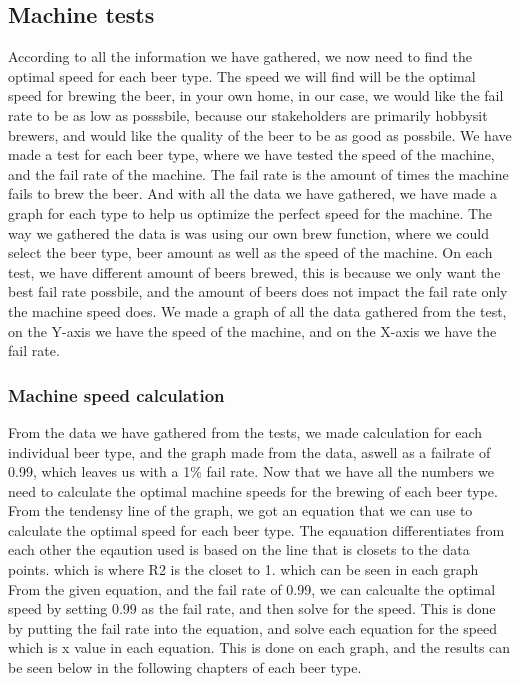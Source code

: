 \subsection{Machine tests}
According to all the information we have gathered, we now need to find the optimal speed for each beer type. The speed we will find will be the optimal speed for brewing the beer, in your own home, in our case,
we would like the fail rate to be as low as posssbile, because our stakeholders are primarily hobbysit brewers, and would like the quality of the beer to be as good as possbile.
We have made a test for each beer type, where we have tested the speed of the machine, and the fail rate of the machine. The fail rate is the amount of times the machine fails to brew the beer.
And with all the data we have gathered, we have made a graph for each type to help us optimize the perfect speed for the machine. \newline
The way we gathered the data is was using our own brew function, where we could select the beer type, beer amount as well as the speed of the machine. On each test, we have different amount of beers brewed, this is because we only want the best fail rate possbile, and the amount of beers does not impact the fail rate only the machine speed does.
We made a graph of all the data gathered from the test, on the Y-axis we have the speed of the machine, and on the X-axis we have the fail rate. \newline

\subsubsection{Machine speed calculation}
From the data we have gathered from the tests, we made calculation for each individual beer type, and the graph made from the data, aswell as a failrate of 0.99, 
which leaves us with a 1\% fail rate. Now that we have all the numbers we need to calculate the optimal machine speeds for the brewing of each beer type. \newline
From the tendensy line of the graph, we got an equation that we can use to calculate the optimal speed for each beer type. The eqauation differentiates from each other the eqaution used is based on the line that is closets to the data points. which is where R2 is the closet to 1. which can be seen in each graph \newline
From the given equation, and the fail rate of 0.99, we can calcualte the optimal speed by setting 0.99 as the fail rate, and then solve for the speed. This is done by putting the fail rate into the equation, and solve each equation for the speed which is x value in each equation. \newline
This is done on each graph, and the results can be seen below in the following chapters of each beer type. \newline



